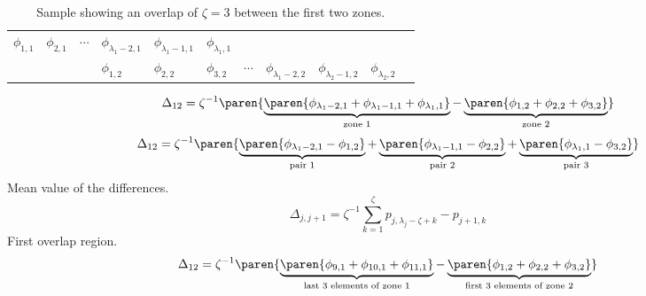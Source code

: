  \begin{table}[htbp]  %
    \caption[Sample showing two zones with overlap.]{Sample showing an overlap of $\zeta=3$ between the first two zones.}
    \begin{center}
      \begin{tabular}{lllllllllll}
        $\phi_{1,1}$ & $\phi_{2,1}$ & $\cdots$ & $\phi_{\lambda_{1}-2,1}$ & $\phi_{\lambda_{1}-1,1}$ & $\phi_{\lambda_{1},1}$ \\
        &&& $\phi_{1,2}$ & $\phi_{2,2}$ & $\phi_{3,2}$ & $\cdots$ & $\phi_{\lambda_{1}-2,2}$ & $\phi_{\lambda_{2}-1,2}$ & $\phi_{\lambda_{2},2}$ \\
      \end{tabular}
    \end{center}
  \label{tab:stitch raw data}
  \end{table}%

  \begin{equation*}   %
    \Delta_{12} = \zeta^{-1} \paren{
      \underbrace{\paren{\phi_{\lambda_{1}-2,1} + \phi_{\lambda_{1}-1,1} + \phi_{\lambda_{1},1}}}_{\text{zone }1} - 
      \underbrace{\paren{\phi_{1,2} + \phi_{2,2} + \phi_{3,2} }}_{\text{zone }2}}
  \end{equation*}
  \begin{equation*}   %
    \Delta_{12} = \zeta^{-1} \paren{
      \underbrace{ \paren{ \phi_{\lambda_{1}-2,1} - \phi_{1,2} }}_{\text{pair 1}} + 
      \underbrace{ \paren{ \phi_{\lambda_{1}-1,1} - \phi_{2,2} }}_{\text{pair 2}} +  
      \underbrace{ \paren{ \phi_{\lambda_{1},1}   - \phi_{3,2} }}_{\text{pair 3}}}
  \end{equation*}
Mean value of the differences.
  \begin{equation*}   %
    \Delta_{j,j+1} = \zeta^{-1}\sum_{k=1}^{\zeta} p_{j,\lambda_{j}-\zeta+k} - p_{j+1,k}
  \end{equation*}
First overlap region.
  \begin{equation*}   %
    \Delta_{12} = \zeta^{-1} \paren{
      \underbrace{\paren{\phi_{9,1} + \phi_{10,1} + \phi_{11,1} }}_{\text{last 3 elements of zone 1}} -
      \underbrace{\paren{\phi_{1,2} + \phi_{2,2} + \phi_{3,2} }}_{\text{first 3 elements of zone 2}}}
  \end{equation*}
  

